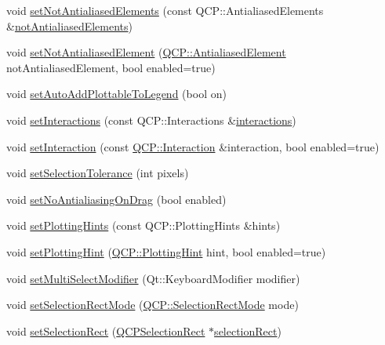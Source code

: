 \begin{DoxyCompactItemize}
void \hyperlink{class_q_custom_plot_ae10d685b5eabea2999fb8775ca173c24}{set\+Not\+Antialiased\+Elements} (const Q\+C\+P\+::\+Antialiased\+Elements \&\hyperlink{class_q_custom_plot_a8060cee59757213764382a78d3196189}{not\+Antialiased\+Elements})
\item 
void \hyperlink{class_q_custom_plot_afc657938a707c890e449ae89203a076d}{set\+Not\+Antialiased\+Element} (\hyperlink{namespace_q_c_p_ae55dbe315d41fe80f29ba88100843a0c}{Q\+C\+P\+::\+Antialiased\+Element} not\+Antialiased\+Element, bool enabled=true)
\item 
void \hyperlink{class_q_custom_plot_ad8858410c2db47b7104040a3aa61c3fc}{set\+Auto\+Add\+Plottable\+To\+Legend} (bool on)
\item 
void \hyperlink{class_q_custom_plot_a5ee1e2f6ae27419deca53e75907c27e5}{set\+Interactions} (const Q\+C\+P\+::\+Interactions \&\hyperlink{class_q_custom_plot_a12401c02b6949a717f5749bb28c62983}{interactions})
\item 
void \hyperlink{class_q_custom_plot_a422bf1bc6d56dac75a3d805d9a65902c}{set\+Interaction} (const \hyperlink{namespace_q_c_p_a2ad6bb6281c7c2d593d4277b44c2b037}{Q\+C\+P\+::\+Interaction} \&interaction, bool enabled=true)
\item 
void \hyperlink{class_q_custom_plot_a4dc31241d7b09680950e19e5f971ed93}{set\+Selection\+Tolerance} (int pixels)
\item 
void \hyperlink{class_q_custom_plot_a775bdcb6329d44701aeaa6135b0e5265}{set\+No\+Antialiasing\+On\+Drag} (bool enabled)
\item 
void \hyperlink{class_q_custom_plot_a94a33cbdadbbac5934843508bcfc210d}{set\+Plotting\+Hints} (const Q\+C\+P\+::\+Plotting\+Hints \&hints)
\item 
void \hyperlink{class_q_custom_plot_a3b7c97bb6c16464e9e15190c07abe9a9}{set\+Plotting\+Hint} (\hyperlink{namespace_q_c_p_a5400e5fcb9528d92002ddb938c1f4ef4}{Q\+C\+P\+::\+Plotting\+Hint} hint, bool enabled=true)
\item 
void \hyperlink{class_q_custom_plot_a8fc96e3b5138a06759a2a90c166df516}{set\+Multi\+Select\+Modifier} (Qt\+::\+Keyboard\+Modifier modifier)
\item 
void \hyperlink{class_q_custom_plot_a810ef958ebe84db661c7288b526c0deb}{set\+Selection\+Rect\+Mode} (\hyperlink{namespace_q_c_p_ac9aa4d6d81ac76b094f9af9ad2d3aacf}{Q\+C\+P\+::\+Selection\+Rect\+Mode} mode)
\item 
void \hyperlink{class_q_custom_plot_a0c09f96df15faa4799ad7051bb16cf33}{set\+Selection\+Rect} (\hyperlink{class_q_c_p_selection_rect}{Q\+C\+P\+Selection\+Rect} $\ast$\hyperlink{class_q_custom_plot_ae64a3994735d8f592a60d9430526a163}{selection\+Rect})

\end{DoxyCompactItemize}
